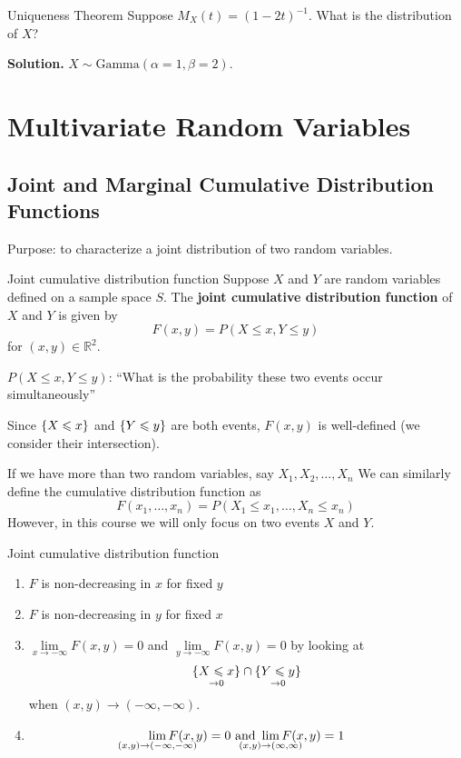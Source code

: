 \begin{Example}{Uniqueness Theorem}{}
    Suppose $ M_X(t)=(1-2t)^{-1} $. What is the
    distribution of $ X $?

    \textbf{Solution.} $ X \sim \text{Gamma}(\alpha=1,\beta=2) $.
\end{Example}

\chapter{Multivariate Random Variables}
\section{Joint and Marginal Cumulative Distribution Functions}
Purpose: to characterize a joint distribution
of two random variables.
\begin{Definition}{Joint cumulative distribution function}{}
    Suppose $ X $ and $ Y $ are random variables defined on
    a sample space $ S $. The \textbf{joint cumulative
        distribution function} of $ X $ and $ Y $ is given by
    \[ F(x,y)=P(X\leqslant x,Y\leqslant y) \]
    for $ (x,y)\in\mathbb{R}^2 $.
\end{Definition}
$ P(X\leqslant x,Y\leqslant y) $:
``What is the probability these two events occur simultaneously''
\begin{Remark}{}{}
    Since $ \{X\leqslant x\} $ and $ \{Y\leqslant y\} $
    are both events, $ F(x,y) $ is well-defined (we consider their intersection).
\end{Remark}
\begin{Remark}{}{}
    If we have more than two random variables, say $ X_1,X_2,\ldots,X_n $
    We can similarly define the cumulative distribution function as
    \[ F(x_1,\ldots,x_n)=P(X_1\leqslant x_1,\ldots,X_n\leqslant x_n) \]
    However, in this course we will only focus on two events $ X $ and $ Y $.
\end{Remark}

\begin{Definition}{Joint cumulative distribution function}{}
    \begin{enumerate}[label=(\Roman*)]
        \item $ F $ is non-decreasing in $ x $ for fixed $ y $
        \item $ F $ is non-decreasing in $ y $ for fixed $ x $
        \item $ \displaystyle \lim\limits_{{x} \to {-\infty}} F(x,y)=0 $
              and $ \displaystyle \lim\limits_{{y} \to {-\infty}} F(x,y)=0 $
              by looking at
              \[ \underset{\to 0}{\{X\leqslant x\}}\cap
                  \underset{\to 0}{\{Y\leqslant y\}} \]
              when $ (x,y)\to(-\infty,-\infty) $.
        \item \[ \displaystyle
                  \smashoperator{\lim\limits_{{(x,y)} \to {(-\infty,-\infty)}}}
                  F(x,y)=0\text{ and }
                  \displaystyle
                  \smashoperator{\lim\limits_{{(x,y)} \to {(\infty,\infty)}}}
                  F(x,y)=1 \]
    \end{enumerate}
\end{Definition}

